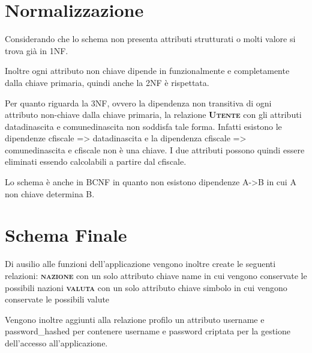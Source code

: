 \documentclass[a4paper,10pt]{article}
\newcommand{\relaz}[1]{\textsc{\textbf{#1}}}
\newcommand{\attr}[1]{\textsf{#1}}
\begin{document}
\section{Normalizzazione}
Considerando che lo schema non presenta attributi strutturati o molti valore si trova già in 1NF.

Inoltre ogni attributo non chiave dipende in funzionalmente e completamente dalla chiave primaria, quindi anche la 2NF è rispettata.

Per quanto riguarda la 3NF, ovvero la dipendenza non transitiva di ogni attributo non-chiave dalla chiave primaria, la relazione \relaz{Utente} con gli attributi \attr{datadinascita} e \attr{comunedinascita} non soddisfa tale forma. Infatti esistono le dipendenze \attr{cfiscale} => \attr{datadinascita} e la dipendenza \attr{cfiscale} => \attr{comunedinascita} e \attr{cfiscale} non è una chiave. I due attributi possono quindi essere eliminati essendo calcolabili a partire dal \attr{cfiscale}.

Lo schema è anche in BCNF in quanto non esistono dipendenze A->B in cui A non chiave determina B.

\section{Schema Finale}
Di ausilio alle funzioni dell'applicazione vengono inoltre create le seguenti relazioni:
\relaz{nazione} con un solo attributo chiave \attr{name} in cui vengono conservate le possibili nazioni
\relaz{valuta} con un solo attributo chiave \attr{simbolo} in cui vengono conservate le possibili valute

Vengono inoltre aggiunti alla relazione profilo un attributo \attr{username} e \attr{password\_{}hashed} per contenere username e password criptata per la gestione dell'accesso all'applicazione.
\end{document}
